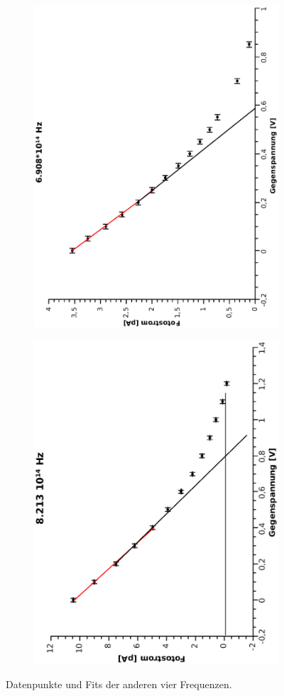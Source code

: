 \documentclass[12pt,a4paper,twopage]{article}
\begin{document}
\begin{center}
\begin{figure}[H]
\begin{subfigure}{0.48\textwidth}
\end{subfigure}
\begin{subfigure}{0.48\textwidth}
\includegraphics[width=0.75\linewidth, angle=-90]{6908.eps}
\end{subfigure}
\begin{subfigure}{0.48\textwidth}
\includegraphics[width=0.75\linewidth, angle=-90]{8213.eps}
\end{subfigure}
\caption{Datenpunkte und Fits der anderen vier Frequenzen.}
\end{figure}
\end{center}
\end{document}
